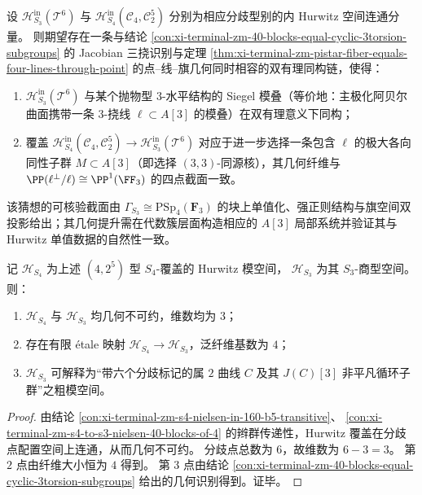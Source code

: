 \begin{conjecture}\label{conj:xi-terminal-zm-hurwitz-parabolic-level3-moduli}
设 \(\mathcal H_{S_3}^{\mathrm{in}}(\mathcal T^6)\) 与 \(\mathcal H_{S_4}^{\mathrm{in}}(\mathcal C_4,\mathcal C_2^5)\) 分别为相应分歧型别的内 Hurwitz 空间连通分量。
则期望存在一条与结论 \ref{con:xi-terminal-zm-40-blocks-equal-cyclic-3torsion-subgroups} 的 Jacobian 三挠识别与定理 \ref{thm:xi-terminal-zm-pistar-fiber-equals-four-lines-through-point} 的点–线–旗几何同时相容的双有理同构链，使得：
\begin{enumerate}
  \item \(\mathcal H_{S_3}^{\mathrm{in}}(\mathcal T^6)\) 与某个抛物型 \(3\)-水平结构的 Siegel 模叠（等价地：主极化阿贝尔曲面携带一条 \(3\)-挠线 \(\ell\subset A[3]\) 的模叠）在双有理意义下同构；
  \item 覆盖 \(\mathcal H_{S_4}^{\mathrm{in}}(\mathcal C_4,\mathcal C_2^5)\to \mathcal H_{S_3}^{\mathrm{in}}(\mathcal T^6)\) 对应于进一步选择一条包含 \(\ell\) 的极大各向同性子群 \(M\subset A[3]\)（即选择 \((3,3)\)-同源核），其几何纤维与 \(\PP(\ell^\perp/\ell)\cong \PP^1(\FF_3)\) 的四点截面一致。
\end{enumerate}
该猜想的可核验截面由 \(\Gamma_{S_3}\cong \mathrm{PSp}_4(\mathbf F_3)\) 的块上单值化、强正则结构与旗空间双投影给出；其几何提升需在代数簇层面构造相应的 \(A[3]\) 局部系统并验证其与 Hurwitz 单值数据的自然性一致。
\end{conjecture}

\begin{corollary}\label{cor:xi-terminal-zm-hurwitz-irreducible-and-genus2-jac3torsion-moduli}
记 \(\mathcal H_{S_4}\) 为上述 \((4,2^5)\) 型 \(S_4\)-覆盖的 Hurwitz 模空间，
\(\mathcal H_{S_3}\) 为其 \(S_3\)-商型空间。则：
\begin{enumerate}
  \item \(\mathcal H_{S_4}\) 与 \(\mathcal H_{S_3}\) 均几何不可约，维数均为 \(3\)；
  \item 存在有限 \'{e}tale 映射 \(\mathcal H_{S_4}\to \mathcal H_{S_3}\)，泛纤维基数为 \(4\)；
  \item \(\mathcal H_{S_3}\) 可解释为“带六个分歧标记的属 \(2\) 曲线 \(C\) 及其 \(J(C)[3]\) 非平凡循环子群”之粗模空间。
\end{enumerate}
\end{corollary}
\begin{proof}
由结论 \ref{con:xi-terminal-zm-s4-nielsen-in-160-b5-transitive}、
\ref{con:xi-terminal-zm-s4-to-s3-nielsen-40-blocks-of-4} 的辫群传递性，Hurwitz 覆盖在分歧点配置空间上连通，从而几何不可约。
分歧点总数为 \(6\)，故维数为 \(6-3=3\)。
第 \(2\) 点由纤维大小恒为 \(4\) 得到。
第 \(3\) 点由结论 \ref{con:xi-terminal-zm-40-blocks-equal-cyclic-3torsion-subgroups} 给出的几何识别得到。证毕。
\end{proof}

